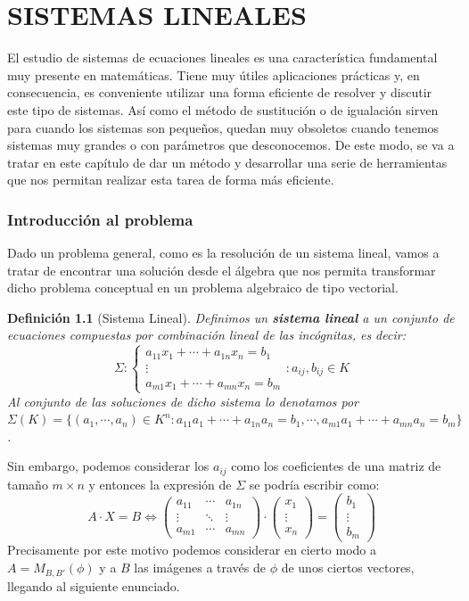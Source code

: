 \documentclass[10pt,a4paper,openright]{book}
\theoremstyle{break}
\newtheorem*{defi}{Definición}
\begin{document}
\chapter{SISTEMAS LINEALES}
El estudio de sistemas de ecuaciones lineales es una característica fundamental muy presente en matemáticas. Tiene muy útiles aplicaciones prácticas y, en consecuencia, es conveniente utilizar una forma eficiente de resolver y discutir este tipo de sistemas. Así como el método de sustitución o de igualación sirven para cuando los sistemas son pequeños, quedan muy obsoletos cuando tenemos sistemas muy grandes o con parámetros que desconocemos. De este modo, se va a tratar en este capítulo de dar un método y desarrollar una serie de herramientas que nos permitan realizar esta tarea de forma más eficiente.

\subsection{Introducción al problema}
Dado un problema general, como es la resolución de un sistema lineal, vamos a tratar de encontrar una solución desde el álgebra que nos permita transformar dicho problema conceptual en un problema algebraico de tipo vectorial.

\begin{defi}[Sistema Lineal]
Definimos un \textbf{sistema lineal} a un conjunto de ecuaciones compuestas por combinación lineal de las incógnitas, es decir:
$$\Sigma: \begin{cases}a_{11} x_1+\cdots+a_{1n}x_n=b_1 \\ \vdots \\ a_{m1}x_1+\cdots+a_{mn}x_n=b_m\end{cases}: a_{ij}, b_{ij}\in K$$
Al conjunto de las soluciones de dicho sistema lo denotamos por $\Sigma(K)=\{(a_1, \cdots, a_n)\in K^n: a_{11}a_1+\cdots+a_{1n}a_n=b_1, \cdots, a_{m1}a_1+\cdots+a_{mn}a_n=b_m\}$.
\end{defi}

Sin embargo, podemos considerar los $a_{ij}$ como los coeficientes de una matriz de tamaño $m\times n$ y entonces la expresión de $\Sigma$ se podría escribir como:
$$A\cdot X=B\Leftrightarrow \begin{pmatrix}
a_{11} &\cdots & a_{1n} \\ \vdots & \ddots & \vdots \\ a_{m1}  & \cdots & a_{mn}\end{pmatrix} \cdot \begin{pmatrix}
x_1 \\ \vdots \\ x_n
\end{pmatrix}=\begin{pmatrix}
b_1 \\ \vdots \\ b_m
\end{pmatrix}$$
Precisamente por este motivo podemos considerar en cierto modo a $A = M_{B,B'}(\phi)$ y a $B$ las imágenes a través de $\phi$ de unos ciertos vectores, llegando al siguiente enunciado.
\end{document}
